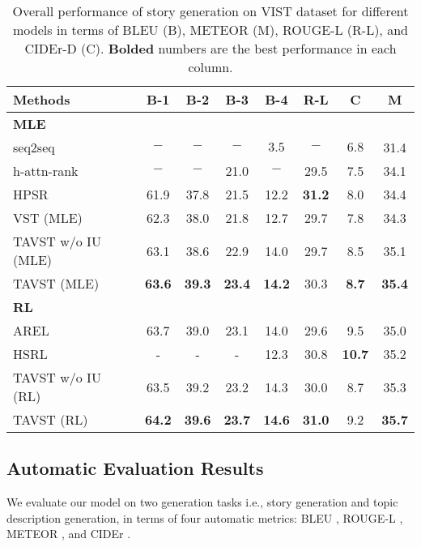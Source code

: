 \documentclass[11pt]{article}
\newcommand{\citep}{\cite}
\begin{document}
{\begin{table*}[t!]
\centering
		\begin{tabular}{lccccccc}
			\hline
			Methods & B-1&B-2&B-3&B-4&R-L&C&M\\
			\hline
			\multicolumn{7}{l}{\textbf{MLE}} \\
			\hline
			seq2seq \citep{huang2016visual} & $-$ & $-$ & $-$ & $3.5$ & $-$ & $6.8$ & 31.4\\
			h-attn-rank \citep{yu2017hierarchically} & $-$ & $-$ & 21.0 & $-$ & 29.5 & 7.5 & 34.1\\
			HPSR \citep{wang2019hierarchical} & 61.9 & 37.8 & 21.5  & 12.2 & \textbf{31.2} & 8.0 & 34.4\\
			\hline
			VST (MLE) & 62.3 & 38.0 & 21.8  & 12.7 & 29.7 & 7.8 & 34.3\\
            TAVST w/o IU (MLE)  & 63.1 & 38.6 & 22.9 & 14.0 & 29.7 & 8.5 & 35.1\\
            TAVST (MLE) & \textbf{63.6} & \textbf{39.3} & \textbf{23.4} & \textbf{14.2} & 30.3 & \textbf{8.7} & \textbf{35.4}\\
            \hline
			\multicolumn{7}{l}{\textbf{RL}} \\
			\hline
			AREL \citep{Wang:2018tda} & 63.7 & 39.0 & 23.1  & 14.0 & 29.6 & 9.5 & 35.0\\
			HSRL \citep{huang2019hierarchically} & - & - & -  & 12.3 & 30.8 & \textbf{10.7} & 35.2\\
			\hline
TAVST w/o IU (RL)  & 63.5 & 39.2 & 23.2 & 14.3 & 30.0 & 8.7 & 35.3\\
			TAVST (RL) & \textbf{64.2} & \textbf{39.6} & \textbf{23.7} & \textbf{14.6} & \textbf{31.0} & 9.2 & \textbf{35.7}\\
			\hline
		\end{tabular}
		\caption{ Overall performance of story generation on VIST dataset for different models in terms of BLEU (B), METEOR (M), ROUGE-L (R-L), and CIDEr-D (C). \textbf{Bolded} numbers are the best performance in each column.}
\label{table:automatic-eval}
		\vspace{-2mm}
	\end{table*}
}

\subsection{Automatic Evaluation Results}

We evaluate our model on two generation tasks i.e., story generation and topic description generation, in terms of four automatic metrics: BLEU \cite{papineni2002bleu}, ROUGE-L \citep{lin2004automatic}, METEOR \citep{banerjee2005meteor}, and CIDEr \citep{vedantam2015cider}.
\end{document}
